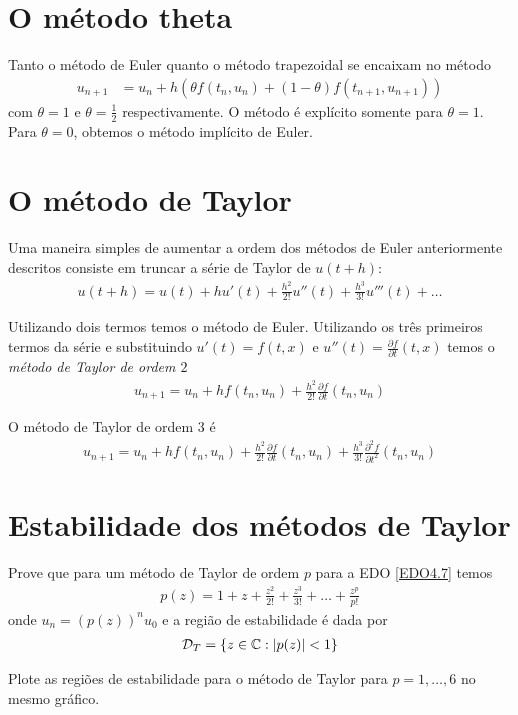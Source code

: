 \section{O método theta}
Tanto o método de Euler quanto o método trapezoidal se encaixam no método
\begin{eqnarray}
  u_{n+1} &= u_n +  h (\theta f(t_n,u_n)+(1-\theta )f(t_{n+1},u_{n+1}))
\end{eqnarray}
com $\theta =1$ e $\theta =\frac{1}{2}$ respectivamente. O método é explícito somente para $\theta =1$. Para $\theta =0$, obtemos o método implícito de Euler.








\section{O método de Taylor}
Uma maneira simples de aumentar a ordem dos métodos de Euler anteriormente descritos consiste em truncar a série de Taylor de $u(t+h)$:
\begin{eqnarray}
 u(t+h)=u(t) +h u'(t)+ \frac{h^2}{2!}u''(t)+\frac{h^3}{3!}u'''(t)+\ldots
\end{eqnarray}

Utilizando dois termos temos o método de Euler. Utilizando os três primeiros termos da série e substituindo $u'(t)=f(t,x)$ e $u''(t)=\frac{\partial f}{\partial t}(t,x)$ temos o \emph{método de Taylor de ordem $2$}
\begin{eqnarray}
   u_{n+1}=u_n +h f(t_n,u_n)+ \frac{h^2}{2!} \frac{\partial f}{\partial t}(t_n,u_n)
\end{eqnarray}


O método de Taylor de ordem $3$ é
\begin{eqnarray*}
   u_{n+1}=u_n +h f(t_n,u_n)+ \frac{h^2}{2!}\frac{\partial f}{\partial t}(t_n,u_n)+\frac{h^3}{3!}\frac{\partial^2 f}{\partial t^2}(t_n,u_n)
\end{eqnarray*}




\section{Estabilidade dos métodos de Taylor}
\begin{ex}
Prove que para um método de Taylor de ordem $p$ para a EDO \eqref{EDO4.7} temos
\begin{eqnarray}
  p(z)= 1 + z+ \frac{z^2}{2!} +\frac{z^3}{3!}+\ldots +\frac{z^p}{p!}
\end{eqnarray}
onde  $u_n = (p(z))^nu_0$ e a região de estabilidade é dada por
\begin{eqnarray}
 \mathcal D_{T} = \{z \in  \mathbb{C}:  \left|p(z)\right|<1\}
\end{eqnarray}

Plote as regiões de estabilidade para o método de Taylor para $p=1,\ldots ,6$ no mesmo gráfico.
\end{ex}

